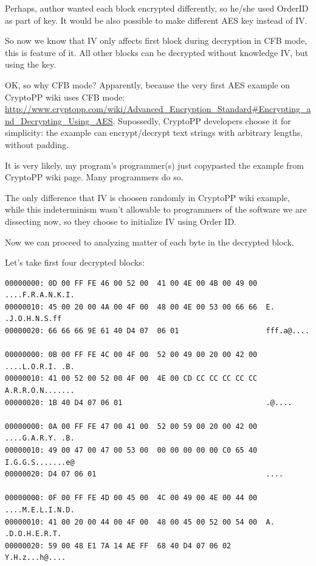 Perhaps, author wanted each block encrypted differently, so he/she used OrderID as part of key.
It would be also possible to make different AES key instead of IV.

So now we know that IV only affects first block during decryption in CFB mode, this is
feature of it.
All other blocks can be decrypted without knowledge IV, but using the key.

OK, so why CFB mode? Apparently, because the very first AES example on CryptoPP wiki
uses CFB mode: 
\url{http://www.cryptopp.com/wiki/Advanced_Encryption_Standard#Encrypting_and_Decrypting_Using_AES}.
Supossedly, CryptoPP developers choose it for simplicity: 
the example can encrypt/decrypt text strings with arbitrary lengths, without padding.

It is very likely, my program's programmer(s) just copypasted the example from CryptoPP wiki page.
Many programmers do so.

The only difference that IV is choosen randomly in CryptoPP wiki example, while this indeterminism
wasn't allowable to programmers of the software we are dissecting now, 
so they choose to initialize IV using Order ID.

Now we can proceed to analyzing matter of each byte in the decrypted block.


Let's take first four decrypted blocks:

\begin{lstlisting}
00000000: 0D 00 FF FE 46 00 52 00  41 00 4E 00 4B 00 49 00  ....F.R.A.N.K.I.
00000010: 45 00 20 00 4A 00 4F 00  48 00 4E 00 53 00 66 66  E. .J.O.H.N.S.ff
00000020: 66 66 66 9E 61 40 D4 07  06 01                    fff.a@....

00000000: 0B 00 FF FE 4C 00 4F 00  52 00 49 00 20 00 42 00  ....L.O.R.I. .B.
00000010: 41 00 52 00 52 00 4F 00  4E 00 CD CC CC CC CC CC  A.R.R.O.N.......
00000020: 1B 40 D4 07 06 01                                 .@....

00000000: 0A 00 FF FE 47 00 41 00  52 00 59 00 20 00 42 00  ....G.A.R.Y. .B.
00000010: 49 00 47 00 47 00 53 00  00 00 00 00 00 C0 65 40  I.G.G.S.......e@
00000020: D4 07 06 01                                       ....

00000000: 0F 00 FF FE 4D 00 45 00  4C 00 49 00 4E 00 44 00  ....M.E.L.I.N.D.
00000010: 41 00 20 00 44 00 4F 00  48 00 45 00 52 00 54 00  A. .D.O.H.E.R.T.
00000020: 59 00 48 E1 7A 14 AE FF  68 40 D4 07 06 02        Y.H.z...h@....
\end{lstlisting}


